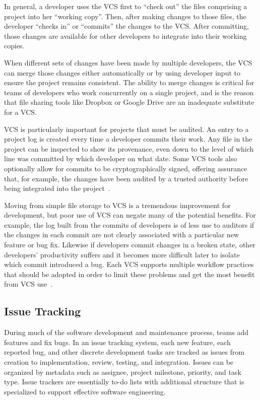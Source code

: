 In general, a developer uses the VCS first to ``check out'' the files
comprising a project into her ``working copy''. Then, after making
changes to those files, the developer ``checks in'' or ``commits'' the
changes to the VCS. After committing, those changes are available for
other developers to integrate into their working copies.

When different sets of changes have been made by multiple developers,
the VCS can merge those changes either automatically or by using
developer input to ensure the project remains consistent. The ability
to merge changes is critical for teams of developers who work
concurrently on a single project, and is the reason that file sharing
tools like Dropbox or Google Drive are an inadequate substitute for a
VCS.

VCS is particularly important for projects that must be audited. An
entry to a project log is created every time a developer commits their
work. Any file in the project can be inspected to show its provenance,
even down to the level of which line was committed by which developer
on what date. Some VCS tools also optionally allow for commits to be
cryptographically signed, offering assurance that, for example, the
changes have been audited by a trusted authority before being
integrated into the project~\cite{chacon2014pro}.

Moving from simple file storage to VCS is a tremendous improvement for
development, but poor use of VCS can negate many of the potential
benefits. For example, the log built from the commits of developers is
of less use to auditors if the changes in each commit are not clearly
associated with a particular new feature or bug fix. Likewise if
developers commit changes in a broken state, other developers'
productivity suffers and it becomes more difficult later to isolate
which commit introduced a bug. Each VCS supports multiple workflow
practices that should be adopted in order to limit these problems and
get the most benefit from VCS
use~\cite{atlassianworkflow,pilato2008version}.

\subsection{Issue Tracking}

During much of the software development and maintenance process, teams
add features and fix bugs. In an issue tracking system, each new
feature, each reported bug, and other discrete development tasks are
tracked as issues from creation to implementation, review, testing,
and integration. Issues can be organized by metadata such as assignee,
project milestone, priority, and task type. Issue trackers are
essentially to-do lists with additional structure that is specialized
to support effective software engineering.

